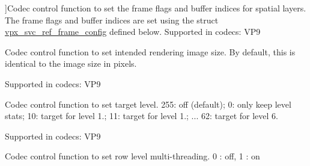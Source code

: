 \begin{Desc}
\begin{description}
{}]Codec control function to set the frame flags and buffer indices for spatial layers. The frame flags and buffer indices are set using the struct \hyperlink{structvpx__svc__ref__frame__config}{vpx\+\_\+svc\+\_\+ref\+\_\+frame\+\_\+config} defined below. Supported in codecs\+: V\+P9 \item[{\em 
V\+P9\+E\+\_\+\+S\+E\+T\+\_\+\+R\+E\+N\+D\+E\+R\+\_\+\+S\+I\+ZE\hypertarget{group__vp8__encoder_gga6deae3d561c838952552c3d3756322ecacabcfc4edba61f54d6a7b7592a64e48b}{}\label{group__vp8__encoder_gga6deae3d561c838952552c3d3756322ecacabcfc4edba61f54d6a7b7592a64e48b}
}]Codec control function to set intended rendering image size. By default, this is identical to the image size in pixels.

Supported in codecs\+: V\+P9 \item[{\em 
V\+P9\+E\+\_\+\+S\+E\+T\+\_\+\+T\+A\+R\+G\+E\+T\+\_\+\+L\+E\+V\+EL\hypertarget{group__vp8__encoder_gga6deae3d561c838952552c3d3756322eca2e6d09f137b021acf240cdfc1a7372a8}{}\label{group__vp8__encoder_gga6deae3d561c838952552c3d3756322eca2e6d09f137b021acf240cdfc1a7372a8}
}]Codec control function to set target level. 255\+: off (default); 0\+: only keep level stats; 10\+: target for level 1.; 11\+: target for level 1.; ... 62\+: target for level 6.

Supported in codecs\+: V\+P9 \item[{\em 
V\+P9\+E\+\_\+\+S\+E\+T\+\_\+\+R\+O\+W\+\_\+\+MT\hypertarget{group__vp8__encoder_gga6deae3d561c838952552c3d3756322eca8ec97b90e57f4ddba099cd881a509360}{}\label{group__vp8__encoder_gga6deae3d561c838952552c3d3756322eca8ec97b90e57f4ddba099cd881a509360}
}]Codec control function to set row level multi-\/threading. 0 \+: off, 1 \+: on


\end{description}
\end{Desc}

